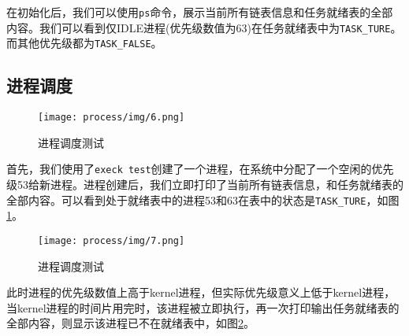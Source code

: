 在初始化后，我们可以使用\texttt{ps}命令，展示当前所有链表信息和任务就绪表的全部内容。我们可以看到仅IDLE进程(优先级数值为63)在任务就绪表中为\texttt{TASK\_TURE}。而其他优先级都为\texttt{TASK\_FALSE}。

\subsection{进程调度}

\begin{figure}[H]
  \centering
  \texttt{[image: process/img/6.png]}
  \caption{进程调度测试}
  \label{process-img-6}
\end{figure}


首先，我们使用了\texttt{execk test}创建了一个进程，在系统中分配了一个空闲的优先级53给新进程。进程创建后，我们立即打印了当前所有链表信息，和任务就绪表的全部内容。可以看到处于就绪表中的进程53和63在表中的状态是\texttt{TASK\_TURE}，如图\ref{process-img-6}。

\begin{figure}[H]
  \centering
  \texttt{[image: process/img/7.png]}
  \caption{进程调度测试}
  \label{process-img-7}
\end{figure}

此时进程的优先级数值上高于kernel进程，但实际优先级意义上低于kernel进程，当kernel进程的时间片用完时，该进程被立即执行，再一次打印输出任务就绪表的全部内容，则显示该进程已不在就绪表中，如图\ref{process-img-7}。

